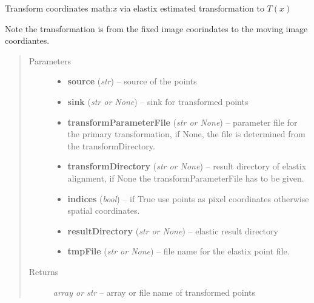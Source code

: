 \documentclass[letterpaper,10pt,english]{sphinxmanual}
\begin{document}

\begin{fulllineitems}
\label{api/ClearMap.Alignment:ClearMap.Alignment.Elastix.transformPoints}
Transform coordinates math:\emph{x} via elastix estimated transformation to $T(x)$

Note the transformation is from the fixed image coorindates to the moving image coordiantes.
\begin{quote}\begin{description}
\item[{Parameters}] \leavevmode\begin{itemize}
\item {} 
\textbf{source} (\emph{str}) --
source of the points

\item {} 
\textbf{sink} (\emph{str or None}) --
sink for transformed points

\item {} 
\textbf{transformParameterFile} (\emph{str or None}) --
parameter file for the primary transformation, if None, the file is determined from the transformDirectory.

\item {} 
\textbf{transformDirectory} (\emph{str or None}) --
result directory of elastix alignment, if None the transformParameterFile has to be given.

\item {} 
\textbf{indices} (\emph{bool}) --
if True use points as pixel coordinates otherwise spatial coordinates.

\item {} 
\textbf{resultDirectory} (\emph{str or None}) --
elastic result directory

\item {} 
\textbf{tmpFile} (\emph{str or None}) --
file name for the elastix point file.

\end{itemize}

\item[{Returns}] \leavevmode
\emph{array or str} --
array or file name of transformed points

\end{description}\end{quote}

\end{fulllineitems}
\end{document}
